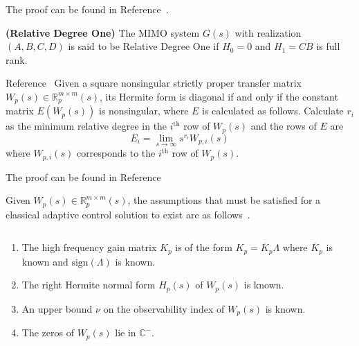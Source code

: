 \begin{proof-dan}
  The proof can be found in Reference\ \cite{antsaklis.linearsystems.2006}.
\end{proof-dan}

\begin{defn-dan}
  \textbf{(Relative Degree One)}\label{defn.relativedegreeone}
  The MIMO system $G(s)$ with realization $(A,B,C,D)$ is said to be Relative Degree One if $H_{0}=0$ and $H_{1}=CB$ is full rank.
\end{defn-dan}

\begin{lem-dan}\label{lem.E}
  Reference\ \cite{narendra.stable.2005}
  Given a square nonsingular strictly proper transfer matrix $W_{p}(s)\in\mathbb{R}_{p}^{m\times m}(s)$, its Hermite form is diagonal if and only if the constant matrix $E(W_{p}(s))$ is nonsingular, where $E$ is calculated as follows.
  Calculate $r_{i}$ as the minimum relative degree in the $i^{\text{th}}$ row of $W_{p}(s)$ and the rows of $E$ are
  \begin{equation}
    \label{eqn.Ei}
    E_{i}=\lim_{s\rightarrow\infty}s^{r_{i}}W_{p,i}(s)
  \end{equation}
  where $W_{p,i}(s)$ corresponds to the $i^{\text{th}}$ row of $W_{p}(s)$.
\end{lem-dan}

\begin{proof-dan}
  The proof can be found in Reference\ \cite{chen.introduction.1970}
\end{proof-dan}

Given $W_{p}(s)\in\mathbb{R}_{p}^{m\times m}(s)$, the assumptions that must be satisfied for a classical adaptive control solution to exist are as follows\ \cite{narendra.stable.2005}.

\begin{customthm}{2} $\;$\label{ass.classical}
  \begin{enumerate}[(\roman{enumi}), ref=\roman{enumi}]
    \itemsep0em
    \item{The high frequency gain matrix $K_{p}$ is of the form $K_{p}=\overline{K}_{p}\Lambda$ where $\overline{K}_{p}$ is known and $\text{sign}(\Lambda)$ is known.\label{ass.kp}}
    \item{The right Hermite normal form $H_{p}(s)$ of $W_{p}(s)$ is known.\label{ass.hermite}}
    \item{An upper bound $\nu$ on the observability index of $W_{p}(s)$ is known.\label{ass.nu}}
    \item{The zeros of $W_{p}(s)$ lie in $\mathbb{C}^{-}$.\label{ass.tzeroWp}}
  \end{enumerate}
\end{customthm}

